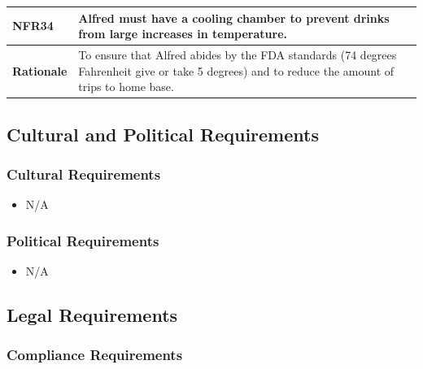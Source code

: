 \documentclass [11pt]{article}
\begin{document}
\begin{longtable}{| p{ } | p{ } | }\hline 
\rowcolor{tableCell}\textbf{NFR34} & Alfred must have a cooling chamber to prevent drinks from large increases in temperature. \\ \hline
\textbf{Rationale} & To ensure that Alfred abides by the FDA standards (74 degrees Fahrenheit give or take 5 degrees) and to reduce the amount of trips to home base.\\ \hline 
\end{longtable}


\subsection{Cultural and Political Requirements } 

\subsubsection{Cultural Requirements }
	\begin{itemize}
		\item N/A
	\end{itemize}

\subsubsection{Political Requirements }
	\begin{itemize}
		\item N/A
	\end{itemize}

\subsection{Legal Requirements}

\subsubsection{Compliance Requirements }
\end{document}
